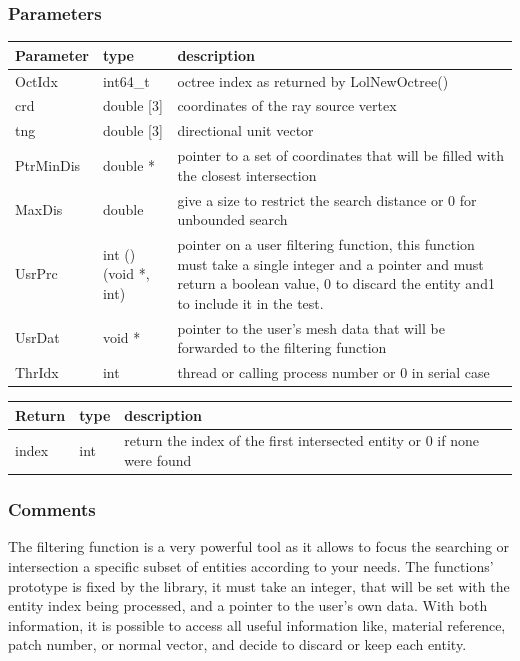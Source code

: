\documentclass[a4paper,12pt]{article}
\begin{document}
\subsubsection*{Parameters}
\begin{tabular}{|m{3cm}|m{2cm}|m{8.5cm}|}
\hline
Parameter  & type       & description \\
\hline
OctIdx     & int64\_t   & octree index as returned by LolNewOctree() \\
\hline
crd        & double [3] & coordinates of the ray source vertex \\
\hline
tng        & double [3] & directional unit vector \\
\hline
PtrMinDis  & double *   & pointer to a set of coordinates that will be filled with the closest intersection \\
\hline
MaxDis     & double     & give a size to restrict the search distance or 0 for unbounded search \\
\hline
UsrPrc     & int ()(void *, int) & pointer on a user filtering function, this function must take a single integer and a pointer and must return a boolean value, 0 to discard the entity and1 to include it in the test. \\
\hline
UsrDat     & void *    & pointer to the user's mesh data that will be forwarded to the filtering function \\
\hline
ThrIdx     & int       & thread or calling process number or 0 in serial case \\
\hline
\end{tabular}

\medskip

\begin{tabular}{|m{3cm}|m{2cm}|m{8.5cm}|}
\hline
Return     & type   & description \\
\hline
index      & int    & return the index of the first intersected entity or 0 if none were found \\
\hline
\end{tabular}
\subsubsection*{Comments}
The filtering function is a very powerful tool as it allows to focus the searching or intersection a specific subset of entities according to your needs. The functions' prototype is fixed by the library, it must take an integer, that will be set with the entity index being processed, and a pointer to the user's own data. With both information, it is possible to access all useful information like, material reference, patch number, or normal vector, and decide to discard or keep each entity.
\end{document}
